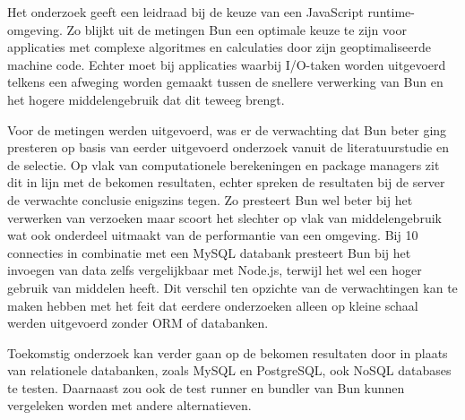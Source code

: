 Het onderzoek geeft een leidraad bij de keuze van een JavaScript runtime-omgeving.
Zo blijkt uit de metingen Bun een optimale keuze te zijn voor applicaties met complexe algoritmes en calculaties door zijn geoptimaliseerde machine code.
Echter moet bij applicaties waarbij I/O-taken worden uitgevoerd telkens een afweging worden gemaakt tussen de snellere verwerking van Bun en het hogere middelengebruik dat dit teweeg brengt.


Voor de metingen werden uitgevoerd, was er de verwachting dat Bun beter ging presteren op basis van eerder uitgevoerd onderzoek vanuit de literatuurstudie en de selectie.
Op vlak van computationele berekeningen en package managers zit dit in lijn met de bekomen resultaten, echter spreken de resultaten bij de server de verwachte conclusie enigszins tegen.
Zo presteert Bun wel beter bij het verwerken van verzoeken maar scoort het slechter op vlak van middelengebruik wat ook onderdeel uitmaakt van de performantie van een omgeving.
Bij 10 connecties in combinatie met een MySQL databank presteert Bun bij het invoegen van data zelfs vergelijkbaar met Node.js, 
terwijl het wel een hoger gebruik van middelen heeft.
Dit verschil ten opzichte van de verwachtingen kan te maken hebben met het feit dat eerdere onderzoeken alleen op kleine schaal werden uitgevoerd zonder ORM of databanken.

Toekomstig onderzoek kan verder gaan op de bekomen resultaten door in plaats van relationele databanken, zoals MySQL en PostgreSQL, ook NoSQL databases te testen.
Daarnaast zou ook de test runner en bundler van Bun kunnen vergeleken worden met andere alternatieven.

